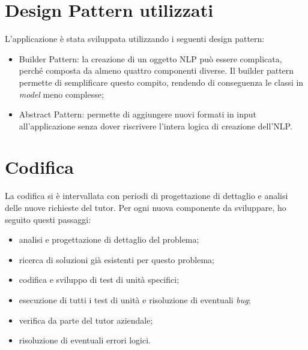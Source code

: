 \section{Design Pattern utilizzati}
L'applicazione è stata sviluppata utilizzando i seguenti design pattern:
\begin{itemize}
    \item Builder Pattern: la creazione di un oggetto NLP può essere complicata, perché composta da almeno quattro componenti diverse. Il builder pattern permette di semplificare questo compito, rendendo di conseguenza le classi in \textit{model} meno complesse;
    \item Abstract Pattern: permette di aggiungere nuovi formati in input all'applicazione senza dover riscrivere l'intera logica di creazione dell'NLP.
\end{itemize}  

\section{Codifica}
La codifica si è intervallata con periodi di progettazione di dettaglio e analisi delle nuove richieste del tutor.
Per ogni nuova componente da sviluppare, ho seguito questi passaggi:
\begin{itemize}
    \item analisi e progettazione di dettaglio del problema;
    \item ricerca di soluzioni già esistenti per questo problema;
    \item codifica e sviluppo di test di unità specifici;
    \item esecuzione di tutti i test di unità e risoluzione di eventuali \textit{bug};
    \item verifica da parte del tutor aziendale;
    \item risoluzione di eventuali errori logici.
\end{itemize}